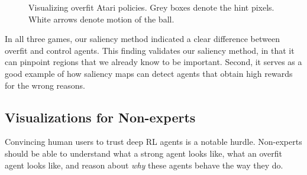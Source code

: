 \documentclass{article}
\begin{document}
\begin{figure}[h!]
\begin{centering}

\hspace{0.15cm}

\hspace{0.15cm}

\hspace{0.15cm}

\end{centering}
\caption{Visualizing overfit Atari policies. Grey boxes denote the hint pixels. White arrows denote motion of the ball.}
\label{fig:overfit}
\end{figure}

In all three games, our saliency method indicated a clear difference between overfit and control agents. This finding validates our saliency method, in that it can pinpoint regions that we already know to be important. Second, it serves as a good example of how saliency maps can detect agents that obtain high rewards for the wrong reasons.

\subsection{Visualizations for Non-experts}

Convincing human users to trust deep RL agents is a notable hurdle. Non-experts should be able to understand what a strong agent looks like, what an overfit agent looks like, and reason about \textit{why} these agents behave the way they do.
\end{document}
